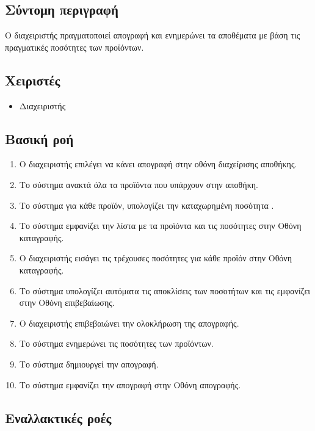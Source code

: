 \documentclass[12pt,a4paper,twoside]{book}
\begin{document}
\subsection{Σύντομη περιγραφή}
Ο διαχειριστής πραγματοποιεί απογραφή και ενημερώνει τα αποθέματα με βάση τις πραγματικές ποσότητες των προϊόντων.

\subsection{Χειριστές}
\begin{itemize}
    \item Διαχειριστής
\end{itemize}

\subsection{Βασική ροή}
\begin{enumerate}
    \item Ο διαχειριστής επιλέγει να κάνει απογραφή στην οθόνη διαχείρισης αποθήκης.
    \item Το σύστημα ανακτά όλα τα προϊόντα που υπάρχουν στην αποθήκη.
    \item Το σύστημα για κάθε προϊόν, υπολογίζει την καταχωρημένη ποσότητα .
    \item Το σύστημα εμφανίζει την λίστα με τα προϊόντα και τις ποσότητες στην Οθόνη καταγραφής.
    \item Ο διαχειριστής εισάγει τις τρέχουσες ποσότητες για κάθε προϊόν στην Οθόνη καταγραφής.
    \item Το σύστημα υπολογίζει αυτόματα τις αποκλίσεις των ποσοτήτων και τις εμφανίζει στην Οθόνη επιβεβαίωσης.
    \item Ο διαχειριστής επιβεβαιώνει την ολοκλήρωση της απογραφής.
    \item Το σύστημα ενημερώνει τις ποσότητες των προϊόντων. 
    \item Το σύστημα δημιουργεί την απογραφή.
    \item Το σύστημα εμφανίζει την απογραφή στην Οθόνη απογραφής.
\end{enumerate}

\subsection{Εναλλακτικές ροές}
\end{document}

